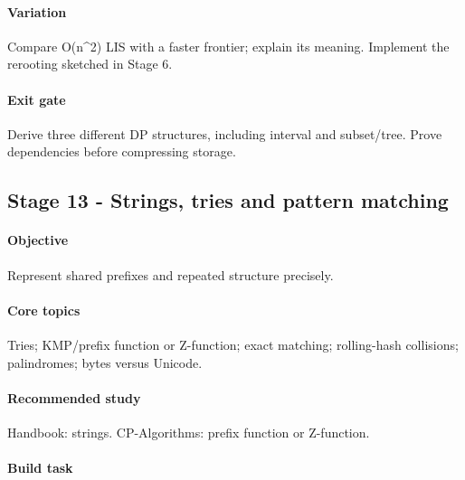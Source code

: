 \documentclass[11pt,letterpaper]{article}
\begin{document}
\paragraph*{Variation}

Compare O(n\textasciicircum{}2) LIS with a faster frontier; explain its meaning. Implement the rerooting sketched in Stage 6.

\paragraph*{Exit gate}

Derive three different DP structures, including interval and subset/tree. Prove dependencies before compressing storage.

\par{}
\begin{samepage}
\section{Stage 13 - Strings, tries and pattern matching}\label{sec:17}

\label{stage:13}


\paragraph*{Objective}

Represent shared prefixes and repeated structure precisely.

\end{samepage}

\paragraph*{Core topics}

Tries; KMP/prefix function or Z-function; exact matching; rolling-hash collisions; palindromes; bytes versus Unicode.

\paragraph*{Recommended study}

Handbook: strings. CP-Algorithms: prefix function or Z-function.

\paragraph*{Build task}
\end{document}
